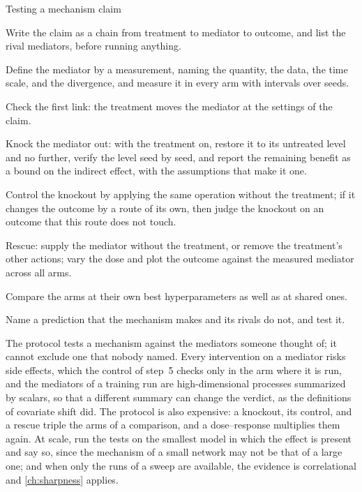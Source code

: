\begin{refsection}
\begin{protocol}{Testing a mechanism claim}\label{prot:mechanisms:test}
\item Write the claim as a chain from treatment to mediator to outcome, and list the rival mediators, before running anything.
\item Define the mediator by a measurement, naming the quantity, the data, the time scale, and the divergence, and measure it in every arm with intervals over seeds.
\item Check the first link: the treatment moves the mediator at the settings of the claim.
\item Knock the mediator out: with the treatment on, restore it to its untreated level and no further, verify the level seed by seed, and report the remaining benefit as a bound on the indirect effect, with the assumptions that make it one.
\item Control the knockout by applying the same operation without the treatment; if it changes the outcome by a route of its own, then judge the knockout on an outcome that this route does not touch.
\item Rescue: supply the mediator without the treatment, or remove the treatment's other actions; vary the dose and plot the outcome against the measured mediator across all arms.
\item Compare the arms at their own best hyperparameters as well as at shared ones.
\item Name a prediction that the mechanism makes and its rivals do not, and test it.
\end{protocol}

The protocol tests a mechanism against the mediators someone thought of; it cannot exclude one that nobody named. Every intervention on a mediator risks side effects, which the control of step~5 checks only in the arm where it is run, and the mediators of a training run are high-dimensional processes summarized by scalars, so that a different summary can change the verdict, as the definitions of covariate shift did. The protocol is also expensive: a knockout, its control, and a rescue triple the arms of a comparison, and a dose--response multiplies them again. At scale, run the tests on the smallest model in which the effect is present and say so, since the mechanism of a small network may not be that of a large one; and when only the runs of a sweep are available, the evidence is correlational and \cref{ch:sharpness} applies.


\end{refsection}
